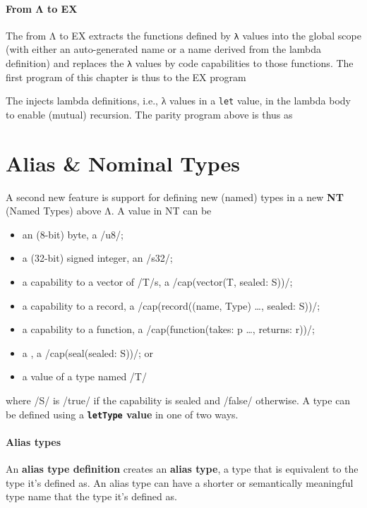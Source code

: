 \documentclass[main.tex]{subfiles}
\begin{document}
\paragraph{From Λ to EX} The  from Λ to EX extracts the functions defined by \texttt{λ} values into the global scope (with either an auto-generated name or a name derived from the lambda definition) and replaces the \texttt{λ} values by code capabilities to those functions. The first program of this chapter is thus \lowered{} to the EX program

The  injects lambda definitions, i.e., λ values in a \texttt{let} value, in the lambda body to enable (mutual) recursion. The parity program above is thus \lowered{} as

\section{Alias \& Nominal Types} \label{sct:named-ty}
A second new feature is support for defining new (named) types in a new  \textbf{NT} (Named Types) above Λ. A value in NT can be
\begin{itemize}[nosep]
	\item an (8-bit) byte, a \iil/u8/;
	\item a (32-bit) signed integer, an \iil/s32/;
	\item a capability to a vector of \iil/T/s, a \iil/cap(vector(T, sealed: S))/;
	\item a capability to a record, a \iil/cap(record((name, Type) …, sealed: S))/;
	\item a capability to a function, a \iil/cap(function(takes: p …, returns: r))/;
	\item a , a \iil/cap(seal(sealed: S))/; or
	\item a value of a type named \iil/T/
\end{itemize}
where \iil/S/ is \iil/true/ if the capability is sealed and \iil/false/ otherwise. A type can be defined using a \textbf{\texttt{letType} value} in one of two ways.

\paragraph{Alias types} An \textbf{alias type definition} creates an \textbf{alias type}, a type that is equivalent to the type it's defined as. An alias type can have a shorter or semantically meaningful type name that the type it's defined as.
\end{document}
